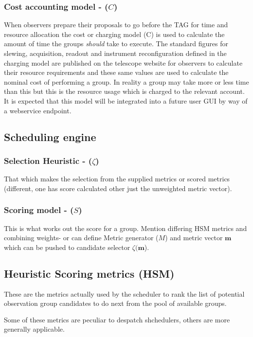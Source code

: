 \subsubsection{Cost accounting model - ($C$)}
When observers prepare their proposals to go before the TAG for time and resource allocation the cost or charging model (C) is  used to calculate the amount of time the groups \emph{should} take to execute. The standard figures for slewing, acquisition, readout and instrument reconfiguration defined in the charging model are published on the telescope website for observers to calculate their resource requirements and these same values are used to calculate the nominal cost of performing a group. In reality a group may take more or less time than this but this is the resource usage which is charged to the relevant account. It is expected that this model will be integrated into a future user GUI by way of a webservice endpoint.

\subsection{Scheduling engine}

\subsubsection{Selection Heuristic - ($\zeta$)}
That which makes the selection from the supplied metrics or scored metrics (different, one has score calculated other just the unweighted metric vector).

\subsubsection{Scoring model - ($S$)}
This is what works out the score for a group. Mention differing HSM metrics and combining weights- or can define Metric generator ($M$) and metric vector $\mathbf{m}$ which can be pushed to candidate selector $\zeta(\mathbf{m}$).



\subsection{Heuristic Scoring metrics (HSM)}

These are the metrics actually used by the scheduler to rank the list of potential observation group candidates to do next from the pool of available groups. 

Some of these metrics are peculiar to despatch shchedulers, others are more generally applicable.

